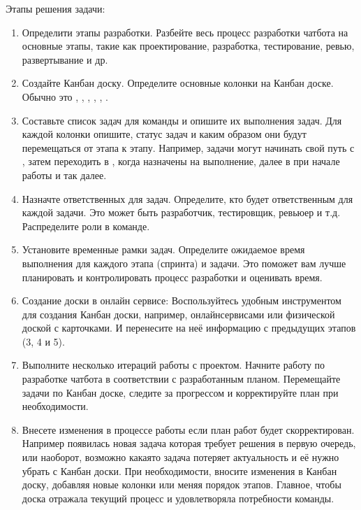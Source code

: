 \documentclass[letterpaper,10pt,russian]{sphinxmanual}
\begin{document}
\sphinxAtStartPar
Этапы решения задачи:
\begin{enumerate}
%
\item {} 
\sphinxAtStartPar
Определити этапы разработки. Разбейте весь процесс разработки чат\sphinxhyphen{}бота на основные этапы, такие как проектирование, разработка, тестирование, ревью, развертывание и др.

\item {} 
\sphinxAtStartPar
Создайте Канбан доску. Определите основные колонки на Канбан доске. Обычно это , , , , , .

\item {} 
\sphinxAtStartPar
Составьте список задач для команды и опишите их выполнения задач. Для каждой колонки опишите, статус задач и каким образом они будут перемещаться от этапа к этапу. Например, задачи могут начинать свой путь с , затем переходить в , когда назначены на выполнение, далее в  при начале работы и так далее.

\item {} 
\sphinxAtStartPar
Назначте ответственных для задач. Определите, кто будет ответственным для каждой задачи. Это может быть разработчик, тестировщик, ревьюер и т.д. Распределите роли в команде.

\item {} 
\sphinxAtStartPar
Установите временные рамки задач. Определите ожидаемое время выполнения для каждого этапа (спринта) и задачи. Это поможет вам лучше планировать и контролировать процесс разработки и оценивать время.

\item {} 
\sphinxAtStartPar
Создание доски в онлайн сервисе: Воспользуйтесь удобным инструментом для создания Канбан доски, например, онлайн\sphinxhyphen{}сервисами или физической доской с карточками. И перенесите на неё информацию с предыдущих этапов (3, 4 и 5).

\item {} 
\sphinxAtStartPar
Выполните несколько итераций работы с проектом. Начните работу по разработке чат\sphinxhyphen{}бота в соответствии с разработанным планом. Перемещайте задачи по Канбан доске, следите за прогрессом и корректируйте план при необходимости.

\item {} 
\sphinxAtStartPar
Внесете изменения в процессе работы если план работ будет скорректирован. Например появилась новая задача которая требует решения в первую очередь, или наоборот, возможно какая\sphinxhyphen{}то задача потеряет актуальность и её нужно убрать с Канбан доски. При необходимости, вносите изменения в Канбан доску, добавляя новые колонки или меняя порядок этапов. Главное, чтобы доска отражала текущий процесс и удовлетворяла потребности команды.

\end{enumerate}
\end{document}
